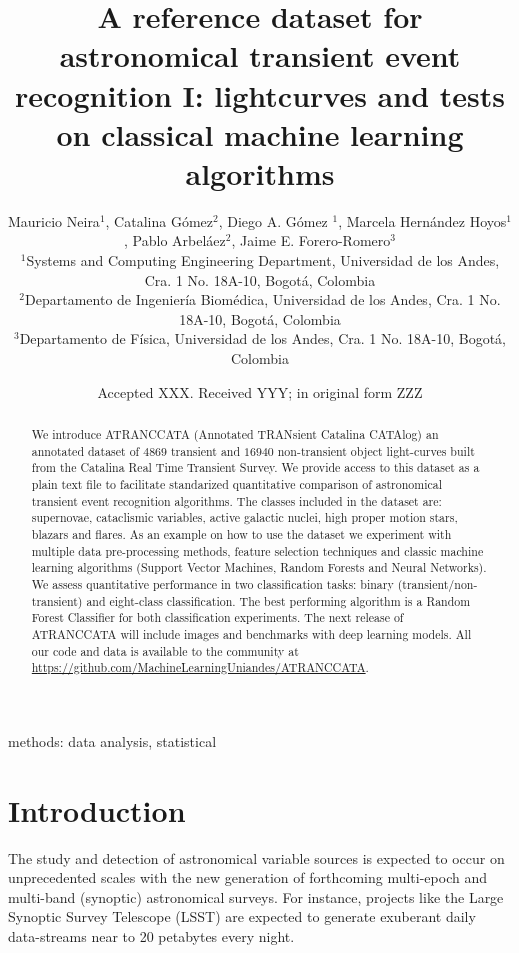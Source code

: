 \documentclass[a4paper,fleqn,usenatbib]{mnras}
\title[A reference transient dataset I: lightcurves]{A reference
  dataset for astronomical transient event recognition I: lightcurves
  and tests on classical machine learning algorithms}
\author[M. Neira et al.]
{Mauricio Neira$^{1}$, Catalina G\'omez$^{2}$, Diego A. G\'omez $^{1}$,
Marcela Hern\'andez Hoyos$^{1}$,   
\newauthor
Pablo Arbel\'aez$^{2}$,
Jaime E. Forero-Romero$^{3}$
\\
$^{1}$Systems and Computing Engineering Department, Universidad de los Andes, Cra. 1 No. 18A-10, Bogot\'a, Colombia\\
$^{2}$Departamento de Ingenier\'ia Biom\'edica, Universidad de los Andes, Cra. 1 No. 18A-10, Bogot\'a, Colombia\\
$^{3}$Departamento de F\'isica, Universidad de los Andes, Cra. 1 No. 18A-10, Bogot\'a, Colombia
}
\date{Accepted XXX. Received YYY; in original form ZZZ}
\begin{document}
\label{firstpage}
\pagerange{\pageref{firstpage}--\pageref{lastpage}}
\maketitle

\begin{abstract}

We introduce ATRANCCATA (Annotated TRANsient Catalina CATAlog) an
annotated dataset of $4869$ transient and $16940$ non-transient
object light-curves built from the Catalina Real Time Transient
Survey.
We provide access to this dataset as a plain text file to facilitate
standarized quantitative comparison of astronomical transient event
recognition algorithms. 
The classes included in the dataset are: supernovae, cataclismic
variables, active galactic nuclei, high proper motion stars, blazars
and flares.
As an example on how to use the dataset we experiment with multiple
data pre-processing methods, feature selection techniques and classic
machine learning algorithms (Support Vector Machines, Random Forests
and Neural Networks).   
We assess quantitative performance in two classification tasks:
binary (transient/non-transient) and eight-class classification.   
The best performing algorithm is a Random Forest Classifier for both
classification experiments.  
The next release of ATRANCCATA will include images and benchmarks with
deep learning models. 
All our code and data is available to the community at
\url{https://github.com/MachineLearningUniandes/ATRANCCATA}.
\end{abstract}

\begin{keywords}
methods: data analysis, statistical
\end{keywords}



\section{Introduction}

The study and detection of astronomical variable sources is expected
to occur on unprecedented scales with the new generation of
forthcoming multi-epoch and multi-band (synoptic) astronomical
surveys. 
For instance, projects like the Large Synoptic Survey Telescope
(LSST)  \citep{0805.2366,1512.07914} are expected to generate
exuberant daily data-streams near to 20 petabytes every night.   
\end{document}

